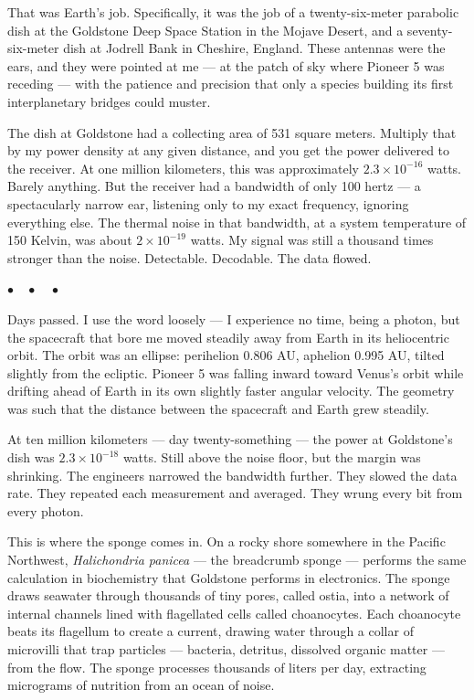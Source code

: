 \documentclass[12pt, letterpaper]{article}
\begin{document}
That was Earth's job. Specifically, it was the job of a twenty-six-meter parabolic dish at the Goldstone Deep Space Station in the Mojave Desert, and a seventy-six-meter dish at Jodrell Bank in Cheshire, England. These antennas were the ears, and they were pointed at me --- at the patch of sky where Pioneer 5 was receding --- with the patience and precision that only a species building its first interplanetary bridges could muster.

The dish at Goldstone had a collecting area of 531 square meters. Multiply that by my power density at any given distance, and you get the power delivered to the receiver. At one million kilometers, this was approximately $2.3 \times 10^{-16}$ watts. Barely anything. But the receiver had a bandwidth of only 100 hertz --- a spectacularly narrow ear, listening only to my exact frequency, ignoring everything else. The thermal noise in that bandwidth, at a system temperature of 150 Kelvin, was about $2 \times 10^{-19}$ watts. My signal was still a thousand times stronger than the noise. Detectable. Decodable. The data flowed.

\begin{center}
$\bullet\quad\bullet\quad\bullet$
\end{center}

Days passed. I use the word loosely --- I experience no time, being a photon, but the spacecraft that bore me moved steadily away from Earth in its heliocentric orbit. The orbit was an ellipse: perihelion 0.806 AU, aphelion 0.995 AU, tilted slightly from the ecliptic. Pioneer 5 was falling inward toward Venus's orbit while drifting ahead of Earth in its own slightly faster angular velocity. The geometry was such that the distance between the spacecraft and Earth grew steadily.

At ten million kilometers --- day twenty-something --- the power at Goldstone's dish was $2.3 \times 10^{-18}$ watts. Still above the noise floor, but the margin was shrinking. The engineers narrowed the bandwidth further. They slowed the data rate. They repeated each measurement and averaged. They wrung every bit from every photon.

This is where the sponge comes in. On a rocky shore somewhere in the Pacific Northwest, \textit{Halichondria panicea} --- the breadcrumb sponge --- performs the same calculation in biochemistry that Goldstone performs in electronics. The sponge draws seawater through thousands of tiny pores, called ostia, into a network of internal channels lined with flagellated cells called choanocytes. Each choanocyte beats its flagellum to create a current, drawing water through a collar of microvilli that trap particles --- bacteria, detritus, dissolved organic matter --- from the flow. The sponge processes thousands of liters per day, extracting micrograms of nutrition from an ocean of noise.
\end{document}
